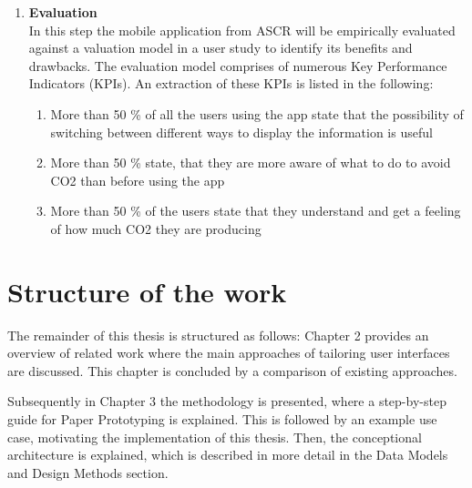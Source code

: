 \begin{enumerate}
	\item \textbf{Evaluation} \\
	In this step the mobile application from ASCR will be empirically evaluated against a valuation model in a user study to identify its benefits and drawbacks. The evaluation model comprises of numerous Key Performance Indicators (KPIs). An extraction of these KPIs is listed in the following:
	\begin{enumerate}
		\item More than 50 \% of all the users using the app state that the possibility of switching between different ways to display the information is useful
		\item More than 50 \% state, that they are more aware of what to do to avoid CO2 than before using the app
		\item More than 50 \% of the users state that they understand and get a feeling of how much CO2 they are producing
	\end{enumerate}
	
	
\end{enumerate}


\section{Structure of the work} 
The remainder of this thesis is structured as follows:  Chapter 2 provides an overview of related work where the main approaches of tailoring user interfaces are discussed. This chapter is concluded by a comparison of existing approaches.

Subsequently in Chapter 3 the methodology is presented, where a step-by-step guide for Paper Prototyping is explained. This is followed by an example use case, motivating the implementation of this thesis. Then, the conceptional architecture is explained, which is described in more detail in the Data Models and Design Methods section.
%
%
%
%

